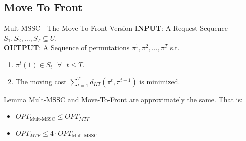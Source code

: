 \documentclass{beamer}
\def\DSSC{\mathrm{Mult}\text{-}\mathrm{MSSC}}
\begin{document}
\subsection{Move To Front}

\begin{frame}{$\DSSC$ - The Move-To-Front Version}
     \textbf{INPUT}: A Request Sequence $S_1, S_2, \ldots, S_T \subseteq U$. \\
     \textbf{OUTPUT}: A Sequence of permutations $\pi^1, \pi^2, \ldots, \pi^T$ s.t.
        \begin{enumerate}
             \item $\pi^t(1) \in S_t \text{ } \forall \text{ } t \leq T$.
             \item The moving cost $\sum_{t=1}^T d_{KT} (\pi^t, \pi^{t-1} )$ is minimized.
        \end{enumerate}
    
     \begin{block}{Lemma}
        $\DSSC$ and Move-To-Front are approximately the same. That is:
        \begin{itemize}
             \item $OPT_{\DSSC} \leq OPT_{MTF}$
             \item $OPT_{MTF} \leq 4 \cdot OPT_{\DSSC}$
        \end{itemize}
    \end{block}
\end{frame}
\end{document}
